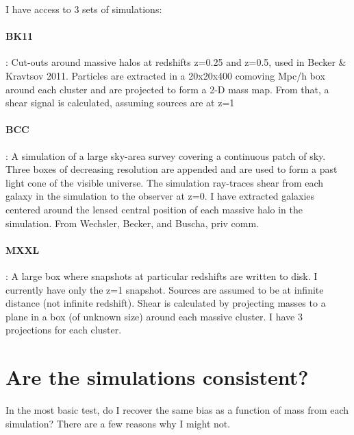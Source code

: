 \documentclass[11pt]{article}
\begin{document}
I have access to 3 sets of simulations:

\paragraph{BK11} : Cut-outs around massive halos at redshifts z=0.25 and z=0.5, used in Becker \& Kravtsov 2011. Particles are extracted in a 20x20x400 comoving Mpc/h box around each cluster and are projected to form a 2-D mass map. From that, a shear signal is calculated, assuming sources are at z=1

\paragraph{BCC} : A simulation of a large sky-area survey covering a continuous patch of sky. Three boxes of decreasing resolution are appended and are used to form a past light cone of the visible universe. The simulation ray-traces shear from each galaxy in the simulation to the observer at z=0. I have extracted galaxies centered around the lensed central position of each massive halo in the simulation. From Wechsler, Becker, and Buscha, priv comm.

\paragraph{MXXL}: A large box where snapshots at particular redshifts are written to disk. I currently have only the z=1 snapshot. Sources are assumed to be at infinite distance (not infinite redshift). Shear is calculated by projecting masses to a plane in a box (of unknown size) around each massive cluster. I have 3 projections for each cluster.



\section{Are the simulations consistent?}

In the most basic test, do I recover the same bias as a function of mass from each simulation? There are a few reasons why I might not. 
\end{document}
